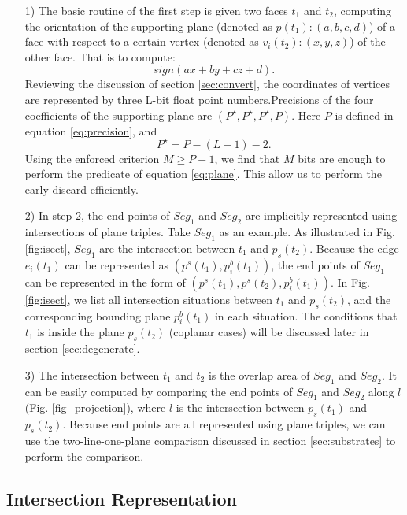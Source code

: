 \documentclass[10pt,journal,compsoc]{IEEEtran}
\begin{document}
\begin{itemize}[leftmargin=0.45cm]
\item[1)] The basic routine of the first step is given two faces $t_1$ and $t_2$, computing the orientation of the supporting plane (denoted as $p(t_1)\colon(a, b, c, d)$) of a face with respect to a certain vertex (denoted as  $v_i(t_2)\colon(x, y, z)$) of the other face. That is to compute:
\begin{equation}\label{eq:plane}
sign(ax+by+cz+d).
\end{equation}
Reviewing the discussion of section \ref{sec:convert},  the coordinates of vertices are represented by three L-bit float point numbers.Precisions of the four coefficients of the supporting plane are $(P^\star, P^\star, P^\star, P)$. Here $P$ is defined in equation \ref{eq:precision}, and $$P^\star=P-(L-1)-2.$$ Using the enforced criterion $M \ge P+1$, we find that $M$ bits are enough to perform the predicate of equation \ref{eq:plane}. This allow us to perform the early discard efficiently.
\item[2)]In step 2, the end points of $Seg_1$ and $Seg_2$ are implicitly represented using intersections of plane triples. Take $Seg_1$ as an example. As illustrated in Fig. \ref{fig:isect}, $Seg_1$ are the intersection between $t_1$ and $p_s(t_2)$. Because the edge $e_i(t_1)$ can be represented as $(p^s( t_1), p^b_i(t_1))$, the end points of $Seg_1$ can be represented in the form of $(p^s( t_1), p^s(t_2), p^b_i(t_1))$. In Fig. \ref{fig:isect}, we list all intersection situations between $t_1$ and $p_s(t_2)$, and the corresponding bounding plane $p^b_i(t_1)$ in each situation. The conditions that $t_1$ is inside the plane $p_s(t_2)$ (coplanar cases) will be discussed later in section \ref{sec:degenerate}.
 \item[3)] The intersection between $t_1$ and $t_2$ is the overlap area of $Seg_1$ and $Seg_2$. It can be easily computed by comparing the end points of $Seg_1$ and $Seg_2$ along $l$ (Fig. \ref{fig_projection}), where $l$ is the intersection between $p_s(t_1)$ and $p_s(t_2)$. Because end points are all represented using plane triples, we can use the two-line-one-plane comparison discussed in section \ref{sec:substrates} to perform the comparison.
\end{itemize}

\subsection{Intersection Representation}
\label{sec:ir}
\end{document}
